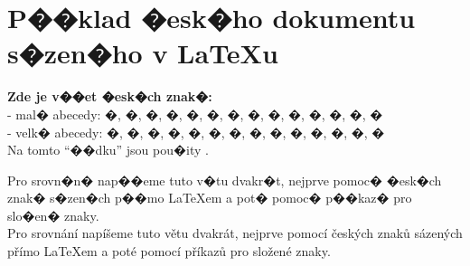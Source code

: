 \documentclass{article}
\begin{document}
\section{P��klad �esk�ho dokumentu s�zen�ho v \LaTeX u}

\textbf{Zde je v��et �esk�ch znak�:}\\
- mal� abecedy: �, �, �, �, �, �, �, �, �, �, �, �, �, �\\
- velk� abecedy: �, �, �, �, �, �, �, �, �, �, �, �, �, �\\[5mm]
%
Na tomto ``��dku'' jsou pou�ity .\\

\bigskip

\noindent Pro srovn�n� nap��eme tuto v�tu dvakr�t, nejprve pomoc� �esk�ch znak� s�zen�ch p��mo \LaTeX em a pot� pomoc� p��kaz� pro slo�en� znaky.\\

\medskip
\noindent Pro srovn\'an\'i nap\'i\v seme tuto v\v etu dvakr\'at, nejprve pomoc\'i \v cesk\'ych znak\r u s\'azen\'ych p\v r\'imo \LaTeX em a pot\'e pomoc\'i p\v r\'ikaz\r u pro slo\v zen\'e znaky.
\end{document}
